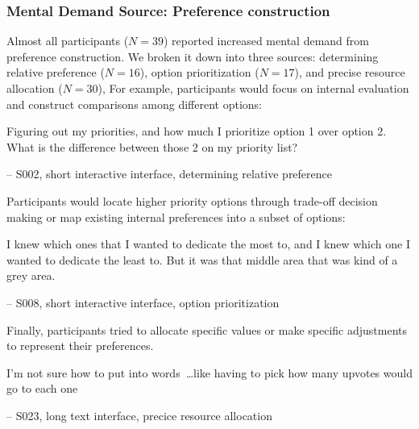 \subsubsection{Mental Demand Source: Preference construction}
Almost all participants ($N=39$) reported increased mental demand from preference construction. We broken it down into three sources: determining relative preference ($N=16$), option prioritization ($N=17$), and precise resource allocation ($N=30$), For example, participants would focus on internal evaluation and construct comparisons among different options:

\begin{displayquote}
Figuring out my priorities, and how much I prioritize option 1 over option 2. What is the difference between those 2 on my priority list?

\hfill -- S002, short interactive interface, determining relative preference
\end{displayquote}


Participants would locate higher priority options through trade-off decision making or map existing internal preferences into a subset of options:

\begin{displayquote}
I knew which ones that I wanted to dedicate the most to, and I knew which one I wanted to dedicate the least to. But it was that middle area that was kind of a grey area.
    
\noindent \hfill -- S008, short interactive interface, option prioritization
\end{displayquote}


Finally, participants tried to allocate specific values or make specific 
adjustments to represent their preferences. 

\begin{displayquote}
I'm not sure how to put into words~\ldots like having to pick how many upvotes would go to each one
    
\noindent \hfill -- S023, long text interface, precice resource allocation
\end{displayquote}

